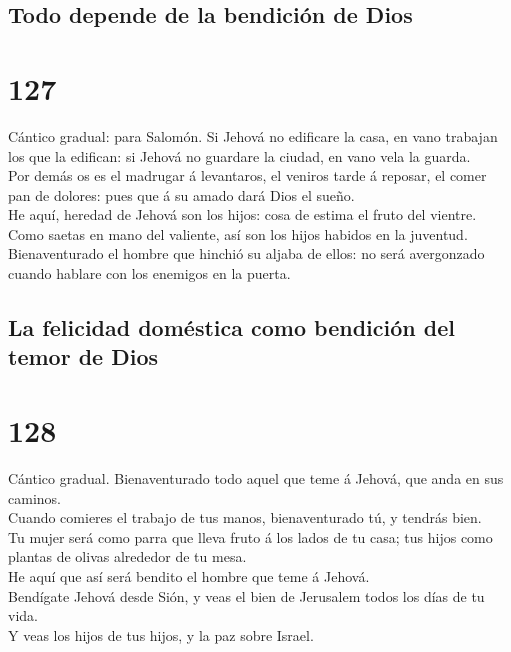 \hypertarget{todo-depende-de-la-bendiciuxf3n-de-dios}{%
\subsection{Todo depende de la bendición de
Dios}\label{todo-depende-de-la-bendiciuxf3n-de-dios}}

\hypertarget{section-19-127}{%
\section{127}\label{section-19-127}}

 Cántico gradual: para Salomón. Si Jehová no edificare la
casa, en vano trabajan los que la edifican: si Jehová no guardare la
ciudad, en vano vela la guarda.\\
 Por demás os es el madrugar á levantaros, el veniros
tarde á reposar, el comer pan de dolores: pues que á su amado dará Dios
el sueño.\\
 He aquí, heredad de Jehová son los hijos: cosa de estima
el fruto del vientre.\\
 Como saetas en mano del valiente, así son los hijos
habidos en la juventud.\\
 Bienaventurado el hombre que hinchió su aljaba de ellos:
no será avergonzado cuando hablare con los enemigos en la puerta.

\hypertarget{la-felicidad-domuxe9stica-como-bendiciuxf3n-del-temor-de-dios}{%
\subsection{La felicidad doméstica como bendición del temor de
Dios}\label{la-felicidad-domuxe9stica-como-bendiciuxf3n-del-temor-de-dios}}

\hypertarget{section-19-128}{%
\section{128}\label{section-19-128}}

 Cántico gradual. Bienaventurado todo aquel que teme á
Jehová, que anda en sus caminos.\\
 Cuando comieres el trabajo de tus manos, bienaventurado
tú, y tendrás bien.\\
 Tu mujer será como parra que lleva fruto á los lados de
tu casa; tus hijos como plantas de olivas alrededor de tu mesa.\\
 He aquí que así será bendito el hombre que teme á
Jehová.\\
 Bendígate Jehová desde Sión, y veas el bien de Jerusalem
todos los días de tu vida.\\
 Y veas los hijos de tus hijos, y la paz sobre Israel.

